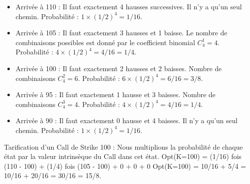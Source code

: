 \begin{itemize}[label=$\cdot$]
    \item Arrivée à 110 : Il faut exactement 4 hausses successives.
    Il n'y a qu'un seul chemin. Probabilité : $1 \times (1/2)^4 = 1/16$.
    
    \item Arrivée à 105 : Il faut exactement 3 hausses et 1 baisse.
    Le nombre de combinaisons possibles est donné par le coefficient binomial $C_4^1 = 4$.
    Probabilité : $4 \times (1/2)^4 = 4/16 = 1/4$.
    
    \item Arrivée à 100 : Il faut exactement 2 hausses et 2 baisses.
    Nombre de combinaisons $C_4^2 = 6$.
    Probabilité : $6 \times (1/2)^4 = 6/16 = 3/8$.
    
    \item Arrivée à 95 : Il faut exactement 1 hausse et 3 baisses.
    Nombre de combinaisons $C_4^3 = 4$.
    Probabilité : $4 \times (1/2)^4 = 4/16 = 1/4$.
    
    \item Arrivée à 90 : Il faut exactement 0 hausse et 4 baisses.
    Il n'y a qu'un seul chemin. Probabilité : $1 \times (1/2)^4 = 1/16$.
\end{itemize}

Tarification d'un Call de Strike 100 :
Nous multiplions la probabilité de chaque état par la valeur intrinsèque du Call dans cet état.
Opt(K=100) = (1/16) fois (110 - 100) + (1/4) fois (105 - 100) + 0 + 0 + 0
Opt(K=100) = 10/16 + 5/4 = 10/16 + 20/16 = 30/16 = 15/8.

